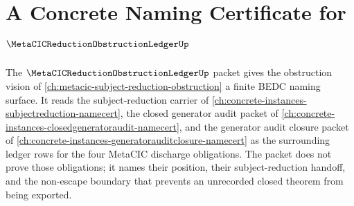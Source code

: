 \chapter{A Concrete Naming Certificate for $\MetaCICReductionObstructionLedgerUp$}
\label{ch:concrete-instances-metacic-reduction-obstruction-ledger-namecert}

The $\MetaCICReductionObstructionLedgerUp$ packet gives the obstruction vision of \autoref{ch:metacic-subject-reduction-obstruction} a finite BEDC naming surface. It reads the subject-reduction carrier of \autoref{ch:concrete-instances-subjectreduction-namecert}, the closed generator audit packet of \autoref{ch:concrete-instances-closedgeneratoraudit-namecert}, and the generator audit closure packet of \autoref{ch:concrete-instances-generatorauditclosure-namecert} as the surrounding ledger rows for the four MetaCIC discharge obligations. The packet does not prove those obligations; it names their position, their subject-reduction handoff, and the non-escape boundary that prevents an unrecorded closed theorem from being exported.

